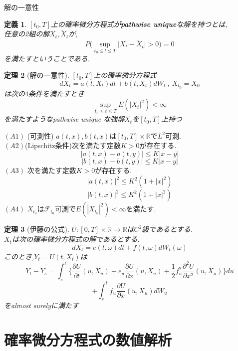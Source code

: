 \documentclass[dvipdfmx,cjk]{beamer}
\numberwithin{equation}{section}
\newtheorem{Thm}     {定理}[section]
\newtheorem{Def}     [Thm]{定義}
\def\R{\mathbb R}
\def\F{\mathcal F}
\def\thm{\begin{Thm}}
\def\thmx{\end{Thm}}
\def\defb{\begin{Def}}
\def\defx{\end{Def}}
\begin{document}
\begin{frame}{解の一意性}
\defb
$[t_0,T]$上の確率微分方程式が{\bf pathwise unique}な解を持つとは,\\
任意の2組の解$X_t,\tilde{X}_t$が,
\[
P \big( \sup_{t_0\le t\le T} \big| X_t - \tilde{X}_t \big | > 0 \big) = 0
\]
を満たすということである.
\defx
\end{frame}


\begin{frame}
\thm[解の一意性]
\label{thm_uniq}
$[t_0,T]$上の確率微分方程式
\[
dX_t = a(t,X_t)dt + b(t,X_t)dW_t \ ,\ X_{t_0} =X_0
\]
は次の$4$条件を満たすとき
\[
\sup_{t_0\le t\le T} E(|X_t|^2) < \infty
\]
を満たすようなpathwise unique な強解$X_t$を$[t_0,T]$上持つ\\

\thmx
\end{frame}

\begin{frame}
$(A1)$ (可測性) $a(t,x),b(t,x)$は$[t_0,T] \times\R$で$L^2$可測.\\
$(A2)$(Lipschitz条件)次を満たす定数$K>0$が存在する.
\[
|a(t,x) - a(t,y) | \le K |x-y|
\]
\[
|b(t,x) - b(t,y) | \le K |x-y|
\]
$(A3)$ 次を満たす定数$K>0$が存在する.
\[
|a(t,x)|^2 \le K^2 (1+|x|^2)
\]
\[
|b(t,x)|^2 \le K^2 (1+|x|^2)
\]
$(A4)$
$X_{t_0}$は$\F_{t_0}$可測で$E(|X_{t_0}|^2)<\infty$を満たす.
\end{frame}


\begin{frame}

\thm[伊藤の公式]
$U:[0,T]\times\R \to \R$は$C^2$級であるとする.\\
$X_t$は次の確率微分方程式の解であるとする.
\[
dX_t = e(t,\omega)dt + f(t,\omega)dW_t(\omega)
\]
このとき,$Y_t=U(t,X_t)$は
\[
Y_t - Y_s = \int_s^t \{ \frac{\partial U}{\partial t}(u,X_u)
+ e_u\frac{\partial U}{\partial x}(u,X_u)
+ \frac{1}{2} f_u^2 \frac{\partial^2 U}{\partial x^2}(u,X_u)\} du
\]
\[
+ \int_s^t f_u \frac{\partial U}{\partial x}(u,X_u)dW_u
\]
をalmost surelyに満たす
\thmx
\end{frame}
\section{確率微分方程式の数値解析}
\end{document}
